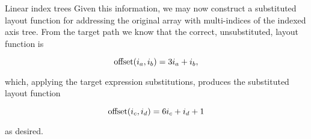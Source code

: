 \documentclass[thesis]{subfiles}
\begin{document}
\begin{example}{Linear index trees}
Given this information, we may now construct a substituted layout function for addressing the original array with multi-indices of the indexed axis tree.
From the target path we know that the correct, unsubstituted, layout function is

\begin{equation*}
  \textnormal{offset}(i_a, i_b) = 3 i_a + i_b,
\end{equation*}

\noindent
which, applying the target expression substitutions, produces the substituted layout function

\begin{equation*}
  \textnormal{offset}(i_c, i_d) = 6 i_c + i_d + 1
\end{equation*}

\noindent
as desired.

\end{example}
\end{document}
